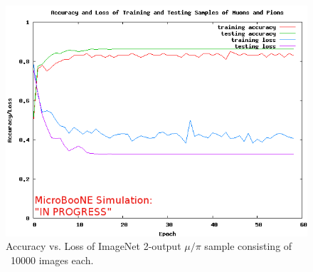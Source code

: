 \begin{figure}[htp!]
\centering
\includegraphics[scale=.55]{figs/acc_loss_10000_062117.png}
\caption{Accuracy vs. Loss of ImageNet 2-output $\mu/\pi$ sample consisting of ~10000 images each.} 
\label{fig:loss_accuracy}
\end{figure}

